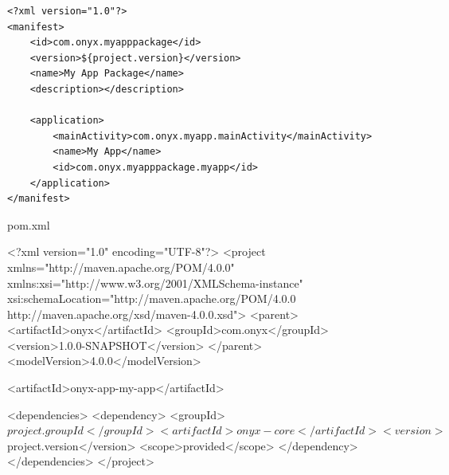 \begin{verbatim}
<?xml version="1.0"?>
<manifest>
    <id>com.onyx.myapppackage</id>
    <version>${project.version}</version>
    <name>My App Package</name>
    <description></description>

    <application>
        <mainActivity>com.onyx.myapp.mainActivity</mainActivity>
        <name>My App</name>
        <id>com.onyx.myapppackage.myapp</id>
    </application>
</manifest>
\end{verbatim}

pom.xml

<?xml version="1.0" encoding="UTF-8"?>
<project xmlns="http://maven.apache.org/POM/4.0.0"
         xmlns:xsi="http://www.w3.org/2001/XMLSchema-instance"
         xsi:schemaLocation="http://maven.apache.org/POM/4.0.0 http://maven.apache.org/xsd/maven-4.0.0.xsd">
    <parent>
        <artifactId>onyx</artifactId>
        <groupId>com.onyx</groupId>
        <version>1.0.0-SNAPSHOT</version>
    </parent>
    <modelVersion>4.0.0</modelVersion>

    <artifactId>onyx-app-my-app</artifactId>

    <dependencies>
        <dependency>
            <groupId>${project.groupId}</groupId>
            <artifactId>onyx-core</artifactId>
            <version>${project.version}</version>
            <scope>provided</scope>
        </dependency>
    </dependencies>
</project>